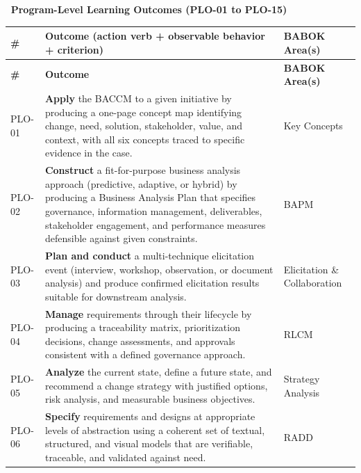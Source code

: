 \documentclass[11pt,letterpaper,oneside]{report}
\begin{document}
\renewcommand{\arraystretch}{1.20}
\noindent\colorbox{afnavy}{\parbox{\dimexpr\linewidth-2\fboxsep\relax}{\raggedright\color{white}\sffamily\bfseries\large\, Program-Level Learning Outcomes (PLO-01 to PLO-15)\strut}}\par\nobreak\vspace{2pt}\nobreak
\setlength{\tabcolsep}{6pt}%
\begin{longtable}{@{}R{0.85cm} R{10.40cm} R{3.05cm}@{}}
\toprule
\sffamily\bfseries \# &
\sffamily\bfseries Outcome (action verb + observable behavior + criterion) &
\sffamily\bfseries BABOK Area(s) \\
\midrule
\endfirsthead
\toprule
\sffamily\bfseries \# &
\sffamily\bfseries Outcome &
\sffamily\bfseries BABOK Area(s) \\
\midrule
\endhead
\bottomrule
\endfoot

PLO-01 & \textbf{Apply} the BACCM to a given initiative by producing a one-page concept map identifying change, need, solution, stakeholder, value, and context, with all six concepts traced to specific evidence in the case. & Key Concepts \\

PLO-02 & \textbf{Construct} a fit-for-purpose business analysis approach (predictive, adaptive, or hybrid) by producing a Business Analysis Plan that specifies governance, information management, deliverables, stakeholder engagement, and performance measures defensible against given constraints. & BAPM \\

PLO-03 & \textbf{Plan and conduct} a multi-technique elicitation event (interview, workshop, observation, or document analysis) and produce confirmed elicitation results suitable for downstream analysis. & Elicitation \& Collaboration \\

PLO-04 & \textbf{Manage} requirements through their lifecycle by producing a traceability matrix, prioritization decisions, change assessments, and approvals consistent with a defined governance approach. & RLCM \\

PLO-05 & \textbf{Analyze} the current state, define a future state, and recommend a change strategy with justified options, risk analysis, and measurable business objectives. & Strategy Analysis \\

PLO-06 & \textbf{Specify} requirements and designs at appropriate levels of abstraction using a coherent set of textual, structured, and visual models that are verifiable, traceable, and validated against need. & RADD \\


\end{longtable}
\end{document}
